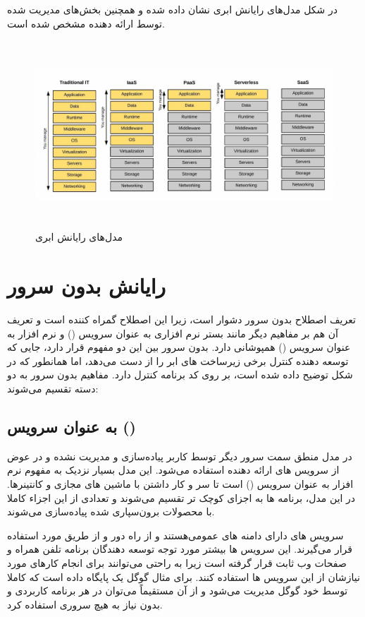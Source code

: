 در شکل مدل‌های رایانش ابری نشان داده شده و همچنین بخش‌های مدیریت شده توسط ارائه دهنده مشخص شده‌ است.

\begin{figure}[!h]
	\centering
	\includegraphics[height=7cm]{Images/cloud-computing-service-models}
	\caption{مدل‌های رایانش ابری}
	\label{تصویر 2-1}
\end{figure}

\section{رایانش بدون سرور}

تعریف اصطلاح بدون سرور دشوار است، زیرا این اصطلاح گمراه کننده است و تعریف آن هم بر مفاهیم دیگر مانند بستر نرم افزاری به عنوان سرویس () و نرم افزار به عنوان سرویس () همپوشانی دارد. بدون سرور بین این دو مفهوم قرار دارد، جایی که توسعه دهنده کنترل برخی زیرساخت های ابر را از دست می‌دهد، اما همانطور که در شکل  توضیح داده شده است، بر روی کد برنامه کنترل دارد. مفاهیم بدون سرور به دو دسته تقسیم می‌شوند:

\subsection{ به عنوان سرویس ()}

در مدل  منطق سمت سرور دیگر توسط کاربر پیاده‌سازی و مدیریت نشده و در عوض از سرویس های ارائه دهنده استفاده می‌شود. این مدل بسیار نزدیک به مفهوم نرم افزار به عنوان سرویس () است تا سر و کار داشتن با ماشین های مجازی و کانتینرها. در این مدل، برنامه ها به اجزای کوچک تر تقسیم می‌شوند و تعدادی از این اجزاء کاملا با محصولات برون‌سپاری شده پیاده‌سازی می‌شوند.

سرویس های  دارای دامنه های عمومی‌هستند و از راه دور و از طریق  مورد استفاده قرار می‌گیرند. این سرویس ها بیشتر مورد توجه توسعه دهندگان برنامه تلفن همراه و صفحات وب ثابت قرار گرفته است زیرا به راحتی می‌توانند برای انجام کارهای مورد نیازشان از این سرویس ها استفاده کنند. برای مثال  گوگل یک پایگاه داده است که کاملا توسط خود گوگل مدیریت می‌شود و از آن مستقیماً می‌توان در هر برنامه کاربردی و بدون نیاز به هیچ سروری استفاده کرد.

